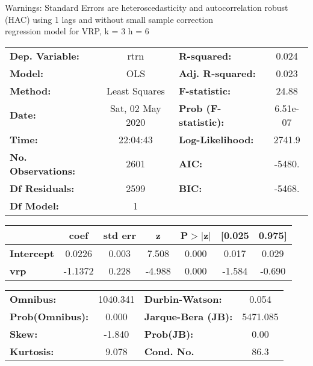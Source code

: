 Warnings: \newline
 [1] Standard Errors are heteroscedasticity and autocorrelation robust (HAC) using 1 lags and without small sample correction\\ 

regression model for VRP, k = 3 h = 6\begin{center}
\begin{tabular}{lclc}
\toprule
\textbf{Dep. Variable:}    &       rtrn       & \textbf{  R-squared:         } &     0.024   \\
\textbf{Model:}            &       OLS        & \textbf{  Adj. R-squared:    } &     0.023   \\
\textbf{Method:}           &  Least Squares   & \textbf{  F-statistic:       } &     24.88   \\
\textbf{Date:}             & Sat, 02 May 2020 & \textbf{  Prob (F-statistic):} &  6.51e-07   \\
\textbf{Time:}             &     22:04:43     & \textbf{  Log-Likelihood:    } &    2741.9   \\
\textbf{No. Observations:} &        2601      & \textbf{  AIC:               } &    -5480.   \\
\textbf{Df Residuals:}     &        2599      & \textbf{  BIC:               } &    -5468.   \\
\textbf{Df Model:}         &           1      & \textbf{                     } &             \\
\bottomrule
\end{tabular}
\begin{tabular}{lcccccc}
                   & \textbf{coef} & \textbf{std err} & \textbf{z} & \textbf{P$> |$z$|$} & \textbf{[0.025} & \textbf{0.975]}  \\
\midrule
\textbf{Intercept} &       0.0226  &        0.003     &     7.508  &         0.000        &        0.017    &        0.029     \\
\textbf{vrp}       &      -1.1372  &        0.228     &    -4.988  &         0.000        &       -1.584    &       -0.690     \\
\bottomrule
\end{tabular}
\begin{tabular}{lclc}
\textbf{Omnibus:}       & 1040.341 & \textbf{  Durbin-Watson:     } &    0.054  \\
\textbf{Prob(Omnibus):} &   0.000  & \textbf{  Jarque-Bera (JB):  } & 5471.085  \\
\textbf{Skew:}          &  -1.840  & \textbf{  Prob(JB):          } &     0.00  \\
\textbf{Kurtosis:}      &   9.078  & \textbf{  Cond. No.          } &     86.3  \\
\bottomrule
\end{tabular}
\end{center}

